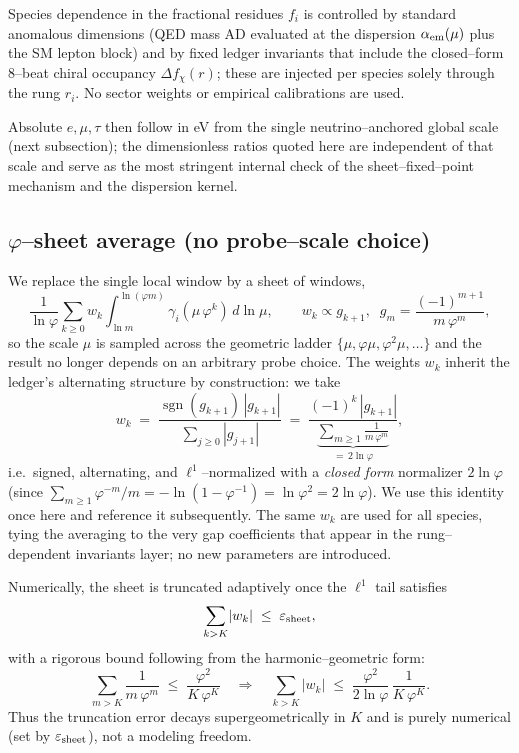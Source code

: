 \documentclass[11pt]{article}
\renewcommand{\phi}{\varphi} %
\begin{document}
Species dependence in the fractional residues $f_i$ is controlled by standard anomalous dimensions (QED mass AD evaluated at the dispersion $\alpha_{\rm em}(\mu)$ plus the SM lepton block) and by fixed ledger invariants that include the closed–form 8–beat chiral occupancy $\Delta f_\chi(r)$; these are injected per species solely through the rung $r_i$. No sector weights or empirical calibrations are used.

Absolute $e,\mu,\tau$ then follow in eV from the single neutrino–anchored global scale (next subsection); the dimensionless ratios quoted here are independent of that scale and serve as the most stringent internal check of the sheet–fixed–point mechanism and the dispersion kernel.

\subsection{$\varphi$--sheet average (no probe--scale choice)}
We replace the single local window by a sheet of windows,
\begin{equation}\label{eq:sheet-average}
\frac{1}{\ln\varphi}\sum_{k\ge0} w_k \!\!\int_{\ln m}^{\ln(\varphi m)}\!\!\gamma_i(\mu\,\varphi^k)\, d\ln\mu,\qquad
w_k\propto g_{k+1},\;\; g_m=\frac{(-1)^{m+1}}{m\,\varphi^m},
\end{equation}
so the scale $\mu$ is sampled across the geometric ladder $\{\mu,\varphi\mu,\varphi^2\mu,\dots\}$ and the result no longer depends on an arbitrary probe choice. The weights $w_k$ inherit the ledger’s alternating structure by construction: we take
\[
w_k \;=\; \frac{\operatorname{sgn}(g_{k+1})\,|g_{k+1}|}{\sum_{j\ge0}|g_{j+1}|}
\;=\; \frac{(-1)^{k}\,|g_{k+1}|}{\underbrace{\sum_{m\ge1}\frac{1}{m\,\varphi^m}}_{=\,2\ln\varphi}},
\]
 i.e.\ signed, alternating, and $\ell^1$--normalized with a \emph{closed form} normalizer $2\ln\varphi$ (since $\sum_{m\ge1}\phi^{-m}/m=-\ln(1-\phi^{-1})=\ln\phi^2=2\ln\phi$). We use this identity once here and reference it subsequently. The same $w_k$ are used for all species, tying the averaging to the very gap coefficients that appear in the rung--dependent invariants layer; no new parameters are introduced.

Numerically, the sheet is truncated adaptively once the $\ell^1$ tail satisfies
\[
\sum_{k>K}\! |w_k| \;\le\; \varepsilon_{\rm sheet},
\]
with a rigorous bound following from the harmonic–geometric form:
\[
\sum_{m>K}\frac{1}{m\,\varphi^m}
\;\le\; \frac{\varphi^2}{K\,\varphi^{K}}
\quad\Rightarrow\quad
\sum_{k>K}\! |w_k|\;\le\;\frac{\varphi^2}{2\ln\varphi}\,\frac{1}{K\,\varphi^{K}}.
\]
Thus the truncation error decays supergeometrically in $K$ and is purely numerical (set by $\varepsilon_{\rm sheet}$), not a modeling freedom.
\end{document}

